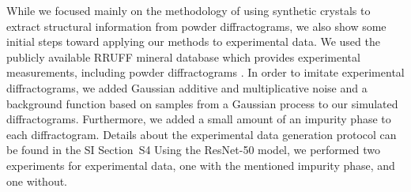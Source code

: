     While we focused mainly on the methodology of using synthetic crystals to
    extract structural information from powder diffractograms, we also show some
    initial steps toward applying our methods to experimental data. We used the
    publicly available RRUFF mineral database
    \supercite{lafuentePowerDatabasesRRUFF2015} which provides experimental
    measurements, including powder diffractograms . In order to imitate
    experimental diffractograms, we added Gaussian additive and multiplicative
    noise 
    and a background function based on samples from a Gaussian process to our
    simulated diffractograms. Furthermore, we added a small amount of an
    impurity phase to each diffractogram. Details about the experimental data
    generation protocol can be found in the SI Section~S4 Using the ResNet-50 model, we performed two experiments for
    experimental data, one with the mentioned impurity phase, and one without.